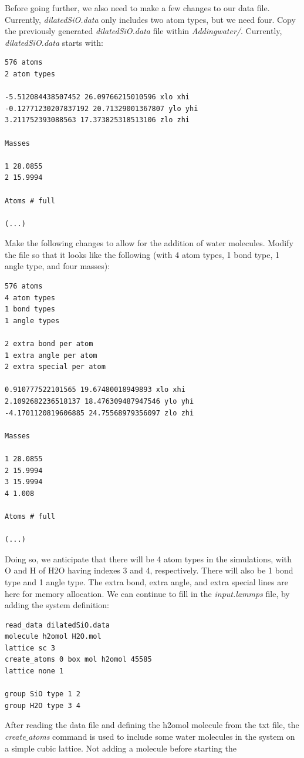 \documentclass[9pt,tutorial]{livecoms}
\begin{document}
Before going further, we also need to make a few changes to our data file. Currently, \textit{dilatedSiO.data} only includes two atom types, but we need four. Copy the previously generated \textit{dilatedSiO.data} file within \textit{Addingwater/}. Currently, \textit{dilatedSiO.data} starts with:
{\normalsize \begin{verbatim}
576 atoms
2 atom types

-5.512084438507452 26.09766215010596 xlo xhi
-0.12771230207837192 20.71329001367807 ylo yhi
3.211752393088563 17.373825318513106 zlo zhi

Masses

1 28.0855
2 15.9994

Atoms # full

(...)
\end{verbatim}}
Make the following changes to allow for the addition of water molecules. Modify the file so that it looks like the following 
(with 4 atom types, 1 bond type, 1 angle type, and four masses):
{\normalsize \begin{verbatim}
576 atoms
4 atom types
1 bond types
1 angle types

2 extra bond per atom
1 extra angle per atom
2 extra special per atom

0.910777522101565 19.67480018949893 xlo xhi
2.1092682236518137 18.476309487947546 ylo yhi
-4.1701120819606885 24.75568979356097 zlo zhi

Masses

1 28.0855
2 15.9994
3 15.9994
4 1.008

Atoms # full

(...)
\end{verbatim}}
Doing so, we anticipate that there will be 4 atom types in the simulations, with O and H of H2O having indexes 3 and 4,
respectively. There will also be 1 bond type and 1 angle type. The extra bond, extra angle, and extra special lines
are here for memory allocation. We can continue to fill in the \textit{input.lammps} file, by adding the system definition:
{\normalsize \begin{verbatim}
read_data dilatedSiO.data
molecule h2omol H2O.mol
lattice sc 3
create_atoms 0 box mol h2omol 45585
lattice none 1

group SiO type 1 2
group H2O type 3 4
\end{verbatim}}
After reading the data file and defining the h2omol molecule from the txt file, the \textit{create$\_$atoms} command is used to
include some water molecules in the system on a simple cubic lattice. Not adding a molecule before starting the
\end{document}
